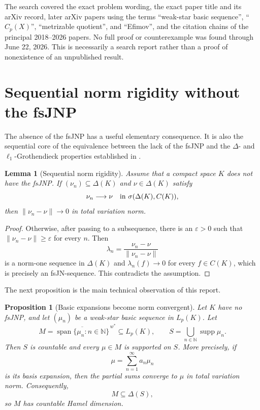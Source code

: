 \documentclass[11pt]{article}
\newtheorem{proposition}[theorem]{Proposition}
\newtheorem{lemma}[theorem]{Lemma}
\newcommand{\Cp}{C_p}
\newcommand{\Lp}{L_p}
\newcommand{\wstar}{w^*}
\newcommand{\supp}{\operatorname{supp}}
\newcommand{\spann}{\operatorname{span}}
\newcommand{\N}{\mathbb{N}}
\begin{document}
The search covered the exact problem wording, the exact paper title and its
arXiv record, later arXiv papers using the terms ``weak-star basic sequence'',
``$\Cp(X)$'', ``metrizable quotient'', and ``Efimov'', and the citation chains
of the principal 2018--2026 papers.  No full proof or counterexample was found
through June 22, 2026.  This is necessarily a search report rather than a proof
of nonexistence of an unpublished result.

\section{Sequential norm rigidity without the fsJNP}
\label{sec:norm-rigidity}

The absence of the fsJNP has a useful elementary consequence.  It is also the
sequential core of the equivalence between the lack of the fsJNP and the
$\Delta$- and $\ell_1$-Grothendieck properties established in
\cite[Theorem~4.1]{KSZ2023}.

\begin{lemma}[Sequential norm rigidity]\label{lem:norm-rigidity}
Assume that a compact space $K$ does not have the fsJNP.  If
$(\nu_n)\subseteq\Delta(K)$ and $\nu\in\Delta(K)$ satisfy
\[
 \nu_n\longrightarrow\nu
 \quad\hbox{in }\sigma(\Delta(K),C(K)),
\]
then $\|\nu_n-\nu\|\to0$ in total variation norm.
\end{lemma}

\begin{proof}
Otherwise, after passing to a subsequence, there is an $\varepsilon>0$ such that
$\|\nu_n-\nu\|\geq\varepsilon$ for every $n$.  Then
\[
 \lambda_n=\frac{\nu_n-\nu}{\|\nu_n-\nu\|}
\]
is a norm-one sequence in $\Delta(K)$ and $\lambda_n(f)\to0$ for every
$f\in C(K)$, which is precisely an fsJN-sequence.  This contradicts the
assumption.
\end{proof}

The next proposition is the main technical observation of this report.

\begin{proposition}[Basic expansions become norm convergent]\label{prop:norm}
Let $K$ have no fsJNP, and let $(\mu_n)$ be a weak-star basic sequence in
$\Lp(K)$.  Let
\[
 M=\overline{\spann\{\mu_n:n\in\N\}}^{\,\wstar}\subseteq\Lp(K),
 \qquad
 S=\bigcup_{n\in\N}\supp\mu_n.
\]
Then $S$ is countable and every $\mu\in M$ is supported on $S$.  More precisely,
if
\[
 \mu=\sum_{n=1}^{\infty}a_n\mu_n
\]
is its basis expansion, then the partial sums converge to $\mu$ in total
variation norm.  Consequently,
\[
 M\subseteq\Delta(S),
\]
so $M$ has countable Hamel dimension.
\end{proposition}
\end{document}
